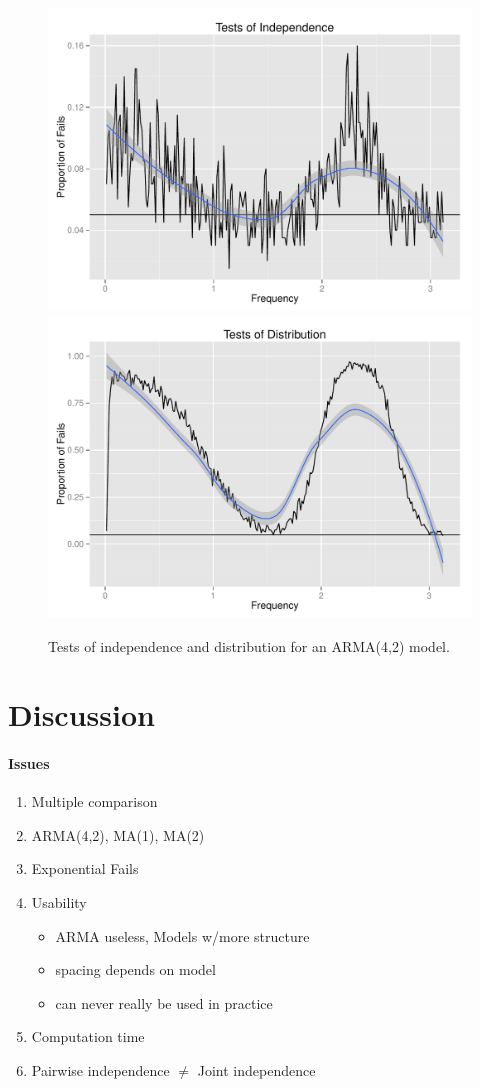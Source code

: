\documentclass{article}\usepackage[]{graphicx}\usepackage[]{color}
\newenvironment{knitrout}{}{} %
\newcommand{\mj}[1]{{\color{blue} #1}}
\theoremstyle{plain}
\begin{document}
\begin{knitrout}
\color{fgcolor}\begin{figure}[H]

\includegraphics[width=.49\textwidth]{figure/tests-arma421} 
\includegraphics[width=.49\textwidth]{figure/tests-arma422} \caption[Tests of independence and distribution for an ARMA(4,2) model]{Tests of independence and distribution for an ARMA(4,2) model.\label{fig:tests-arma42}}
\end{figure}


\end{knitrout}



\section{Discussion}


\mj{
\paragraph{Issues}
\begin{enumerate}
  \item Multiple comparison 
  \item ARMA(4,2), MA(1), MA(2)
  \item Exponential Fails
  \item Usability 
  \begin{itemize}
    \item ARMA useless, Models w/more structure 
    \item spacing depends on model
    \item can never really be used in practice
  \end{itemize}
  \item Computation time
  \item Pairwise independence $\neq$ Joint independence
\end{enumerate}}


\printbibliography
\end{document}
